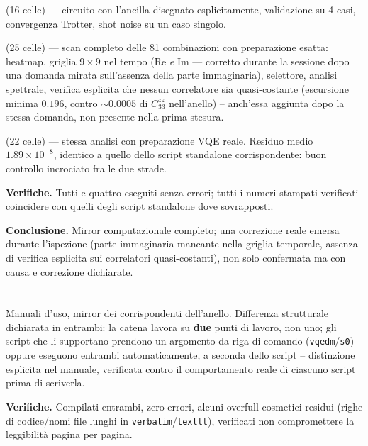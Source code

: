 \documentclass[11pt,a4paper]{article}
\begin{document}
\textbf{\texttt{}} (16 celle) —
circuito con l'ancilla disegnato esplicitamente, validazione su 4 casi, convergenza Trotter, shot
noise su un caso singolo.

\textbf{\texttt{}} (25 celle) —
scan completo delle 81 combinazioni con preparazione esatta: heatmap, griglia $9\times9$ nel
tempo (Re \emph{e} Im — corretto durante la sessione dopo una domanda mirata sull'assenza della
parte immaginaria), selettore, analisi spettrale, verifica esplicita che nessun correlatore sia
quasi-costante (escursione minima $0.196$, contro $\sim0.0005$ di $C_{33}^{zz}$ nell'anello) --
anch'essa aggiunta dopo la stessa domanda, non presente nella prima stesura.

\textbf{\texttt{}} (22 celle) —
stessa analisi con preparazione VQE reale. Residuo medio $1.89\times10^{-8}$, identico a quello
dello script standalone corrispondente: buon controllo incrociato fra le due strade.

\textbf{Verifiche.} Tutti e quattro eseguiti senza errori; tutti i numeri stampati verificati
coincidere con quelli degli script standalone dove sovrapposti.

\textbf{Conclusione.} Mirror computazionale completo; una correzione reale emersa durante
l'ispezione (parte immaginaria mancante nella griglia temporale, assenza di verifica esplicita
sui correlatori quasi-costanti), non solo confermata ma con causa e correzione dichiarate.

\section*{\texttt{}}

Manuali d'uso, mirror dei corrispondenti dell'anello. Differenza strutturale dichiarata in
entrambi: la catena lavora su \textbf{due} punti di lavoro, non uno; gli script che li supportano
prendono un argomento da riga di comando (\texttt{vqedm}/\texttt{s0}) oppure eseguono entrambi
automaticamente, a seconda dello script -- distinzione esplicita nel manuale, verificata contro
il comportamento reale di ciascuno script prima di scriverla.

\textbf{Verifiche.} Compilati entrambi, zero errori, alcuni overfull cosmetici residui (righe di
codice/nomi file lunghi in \texttt{verbatim}/\texttt{texttt}), verificati non compromettere la
leggibilità pagina per pagina.
\end{document}
